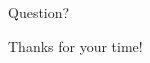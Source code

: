 \documentclass[serif]{beamer}
\begin{document}



\begin{frame}{Question?}
\begin{center}
\Huge{Thanks for your time!}
\end{center}
\end{frame}
\end{document}
